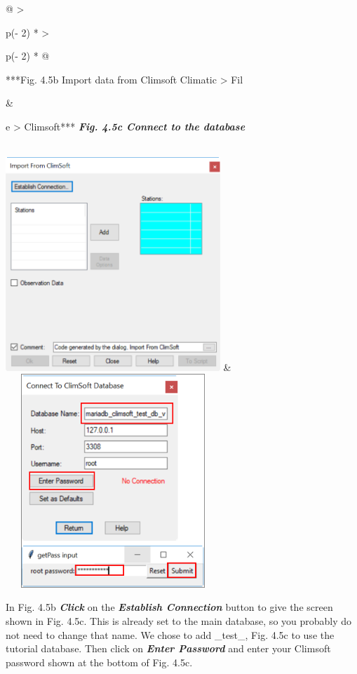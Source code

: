 \documentclass[
  letterpaper,
  DIV=11,
  numbers=noendperiod]{scrreprt}
\begin{document}
\begin{longtable}[]{@{}
  >{\raggedright\arraybackslash}p{(\columnwidth - 2\tabcolsep) * }
  >{\raggedright\arraybackslash}p{(\columnwidth - 2\tabcolsep) * }@{}}
\toprule\noalign{}
\begin{minipage}[b]{\linewidth}\raggedright
***Fig. 4.5b Import data from Climsoft Climatic \textgreater{} Fil
\end{minipage} & \begin{minipage}[b]{\linewidth}\raggedright
e \textgreater{} Climsoft*** \textbf{\emph{Fig. 4.5c Connect to the
database}}
\end{minipage} \\
\midrule\noalign{}
\endhead
\bottomrule\noalign{}
\endlastfoot
\includegraphics[width=3.18567in,height=3.17203in]{figures/Fig4.5b.png}
&
\includegraphics[width=3.18567in,height=3.17203in]{figures/Fig4.5c.png} \\
\end{longtable}

In Fig. 4.5b \textbf{\emph{Click}} on the \textbf{\emph{Establish
Connection}} button to give the screen shown in Fig. 4.5c. This is
already set to the main database, so you probably do not need to change
that name. We chose to add \_test\_, Fig. 4.5c to use the tutorial
database. Then click on \textbf{\emph{Enter Password}} and enter your
Climsoft password shown at the bottom of Fig. 4.5c.
\end{document}
